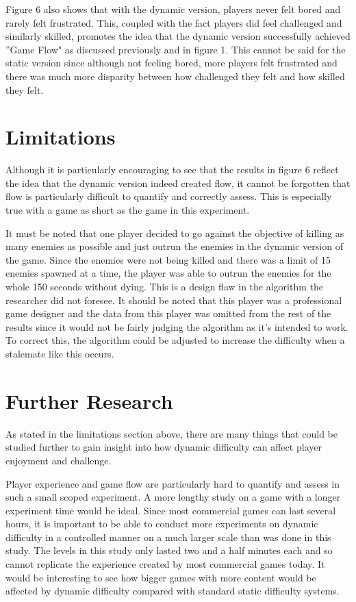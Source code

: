 \documentclass[journal]{IEEEtran}
\begin{document}
Figure 6 also shows that with the dynamic version, players never felt bored and rarely felt frustrated. This, coupled with the fact players did feel challenged and similarly skilled, promotes the idea that the dynamic version successfully achieved ''Game Flow" as discussed previously and in figure 1. This cannot be said for the static version since although not feeling bored, more players felt frustrated and there was much more disparity between how challenged they felt and how skilled they felt. 




\section{Limitations}

Although it is particularly encouraging to see that the results in figure 6 reflect the idea that the dynamic version indeed created flow, it cannot be forgotten that flow is particularly difficult to quantify and correctly assess. This is especially true with a game as short as the game in this experiment.

It must be noted that one player decided to go against the objective of killing as many enemies as possible and just outrun the enemies in the dynamic version of the game. Since the enemies were not being killed and there was a limit of 15 enemies spawned at a time, the player was able to outrun the enemies for the whole 150 seconds without dying. This is a design flaw in the algorithm the researcher did not foresee. It should be noted that this player was a professional game designer and the data from this player was omitted from the rest of the results since it would not be fairly judging the algorithm as it's intended to work. To correct this, the algorithm could be adjusted to increase the difficulty when a stalemate like this occurs.

\section{Further Research}
As stated in the limitations section above, there are many things that could be studied further to gain insight into how dynamic difficulty can affect player enjoyment and challenge. 

Player experience and game flow are particularly hard to quantify and assess in such a small scoped experiment. A more lengthy study on a game with a longer experiment time would be ideal. Since most commercial games can last several hours, it is important to be able to conduct more experiments on dynamic difficulty in a controlled manner on a much larger scale than was done in this study. The levels in this study only lasted two and a half minutes each and so cannot replicate the experience created by most commercial games today. It would be interesting to see how bigger games with more content would be affected by dynamic difficulty compared with standard static difficulty systems. 
\end{document}
